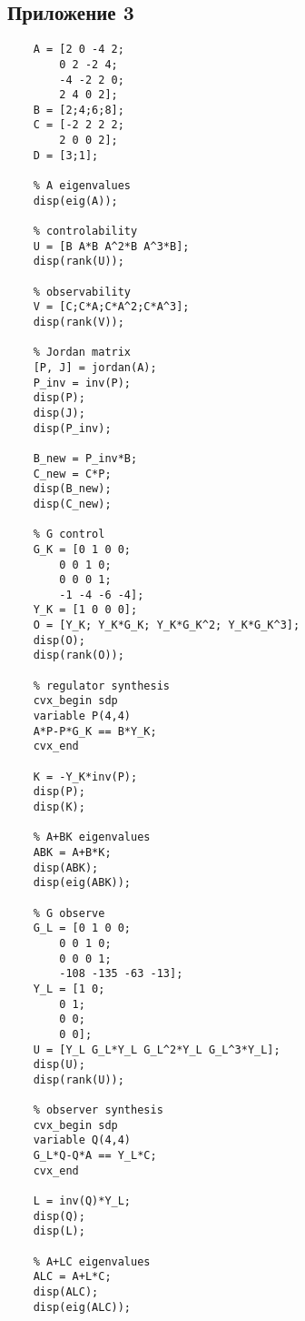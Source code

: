 \documentclass[a4paper, 12pt]{article}
\begin{document}
    \subsection{Приложение 3}
    \begin{lstlisting}[label=task3, caption={Программа для третьего задания}]
    % input data
    A = [2 0 -4 2;
        0 2 -2 4;
        -4 -2 2 0;
        2 4 0 2];
    B = [2;4;6;8];
    C = [-2 2 2 2;
        2 0 0 2];
    D = [3;1];

    % A eigenvalues
    disp(eig(A));

    % controlability
    U = [B A*B A^2*B A^3*B];
    disp(rank(U));

    % observability
    V = [C;C*A;C*A^2;C*A^3];
    disp(rank(V));

    % Jordan matrix
    [P, J] = jordan(A);
    P_inv = inv(P);
    disp(P);
    disp(J);
    disp(P_inv);

    B_new = P_inv*B;
    C_new = C*P;
    disp(B_new);
    disp(C_new);

    % G control
    G_K = [0 1 0 0;
        0 0 1 0;
        0 0 0 1;
        -1 -4 -6 -4];
    Y_K = [1 0 0 0];
    O = [Y_K; Y_K*G_K; Y_K*G_K^2; Y_K*G_K^3];
    disp(O);
    disp(rank(O));

    % regulator synthesis
    cvx_begin sdp
    variable P(4,4)
    A*P-P*G_K == B*Y_K;
    cvx_end

    K = -Y_K*inv(P);
    disp(P);
    disp(K);

    % A+BK eigenvalues
    ABK = A+B*K;
    disp(ABK);
    disp(eig(ABK));

    % G observe
    G_L = [0 1 0 0;
        0 0 1 0;
        0 0 0 1;
        -108 -135 -63 -13];
    Y_L = [1 0;
        0 1;
        0 0;
        0 0];
    U = [Y_L G_L*Y_L G_L^2*Y_L G_L^3*Y_L];
    disp(U);
    disp(rank(U));

    % observer synthesis
    cvx_begin sdp
    variable Q(4,4)
    G_L*Q-Q*A == Y_L*C;
    cvx_end

    L = inv(Q)*Y_L;
    disp(Q);
    disp(L);

    % A+LC eigenvalues
    ALC = A+L*C;
    disp(ALC);
    disp(eig(ALC));
    \end{lstlisting}
\end{document}
